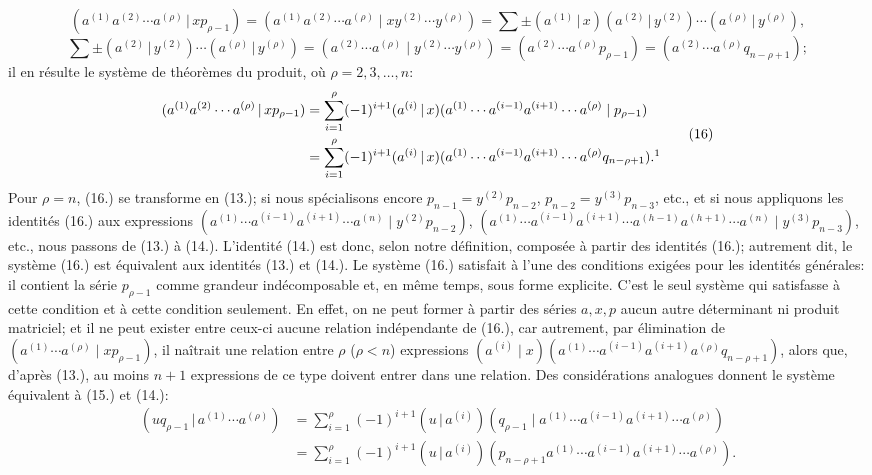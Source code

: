 \documentclass[11pt]{article}
\newcommand{\pair}[2]{(#1\,|\,#2)}
\begin{document}
\[
\pair{a^{(1)}a^{(2)}\cdots a^{(\rho)}}{xp_{\rho-1}}
=(a^{(1)}a^{(2)}\cdots a^{(\rho)}\mid xy^{(2)}\cdots y^{(\rho)})
=\sum\pm\pair{a^{(1)}}{x}\pair{a^{(2)}}{y^{(2)}}\cdots\pair{a^{(\rho)}}{y^{(\rho)}},
\]
\[
\sum\pm\pair{a^{(2)}}{y^{(2)}}\cdots\pair{a^{(\rho)}}{y^{(\rho)}}
=(a^{(2)}\cdots a^{(\rho)}\mid y^{(2)}\cdots y^{(\rho)})
=(a^{(2)}\cdots a^{(\rho)}p_{\rho-1})=(a^{(2)}\cdots a^{(\rho)}q_{n-\rho+1});
\]
il en résulte le système de théorèmes du produit, où $\rho=2,3,\ldots,n$:
\begin{equation}
\begin{aligned}
\pair{a^{(1)}a^{(2)}\cdots a^{(\rho)}}{xp_{\rho-1}}
 &=\sum_{i=1}^{\rho}(-1)^{i+1}\pair{a^{(i)}}{x}(a^{(1)}\cdots a^{(i-1)}a^{(i+1)}\cdots a^{(\rho)}\mid p_{\rho-1})\\
 &=\sum_{i=1}^{\rho}(-1)^{i+1}\pair{a^{(i)}}{x}(a^{(1)}\cdots a^{(i-1)}a^{(i+1)}\cdots a^{(\rho)}q_{n-\rho+1}).\footnotemark
\end{aligned}
\tag{16}
\end{equation}
Pour $\rho=n$, (16.) se transforme en (13.); si nous spécialisons encore $p_{n-1}=y^{(2)}p_{n-2}$, $p_{n-2}=y^{(3)}p_{n-3}$, etc., et si nous appliquons les identités (16.) aux expressions $(a^{(1)}\cdots a^{(i-1)}a^{(i+1)}\cdots a^{(n)}\mid y^{(2)}p_{n-2})$, $(a^{(1)}\cdots a^{(i-1)}a^{(i+1)}\cdots a^{(h-1)}a^{(h+1)}\cdots a^{(n)}\mid y^{(3)}p_{n-3})$, etc., nous passons de (13.) à (14.). L'identité (14.) est donc, selon notre définition, composée à partir des identités (16.); autrement dit, le système (16.) est équivalent aux identités (13.) et (14.). Le système (16.) satisfait à l'une des conditions exigées pour les identités générales: il contient la série $p_{\rho-1}$ comme grandeur indécomposable et, en même temps, sous forme explicite. C'est le seul système qui satisfasse à cette condition et à cette condition seulement. En effet, on ne peut former à partir des séries $a,x,p$ aucun autre déterminant ni produit matriciel; et il ne peut exister entre ceux-ci aucune relation indépendante de (16.), car autrement, par élimination de $(a^{(1)}\cdots a^{(\rho)}\mid xp_{\rho-1})$, il naîtrait une relation entre $\rho$ ($\rho<n$) expressions $(a^{(i)}\mid x)(a^{(1)}\cdots a^{(i-1)}a^{(i+1)}a^{(\rho)}q_{n-\rho+1})$, alors que, d'après (13.), au moins $n+1$ expressions de ce type doivent entrer dans une relation. Des considérations analogues donnent le système équivalent à (15.) et (14.):
\begin{equation}
\begin{aligned}
\pair{u q_{\rho-1}}{a^{(1)}\cdots a^{(\rho)}}
 &=\sum_{i=1}^{\rho}(-1)^{i+1}\pair{u}{a^{(i)}}(q_{\rho-1}\mid a^{(1)}\cdots a^{(i-1)}a^{(i+1)}\cdots a^{(\rho)})\\
 &=\sum_{i=1}^{\rho}(-1)^{i+1}\pair{u}{a^{(i)}}(p_{n-\rho+1}a^{(1)}\cdots a^{(i-1)}a^{(i+1)}\cdots a^{(\rho)}).
\end{aligned}
\tag{17}
\end{equation}
\end{document}

